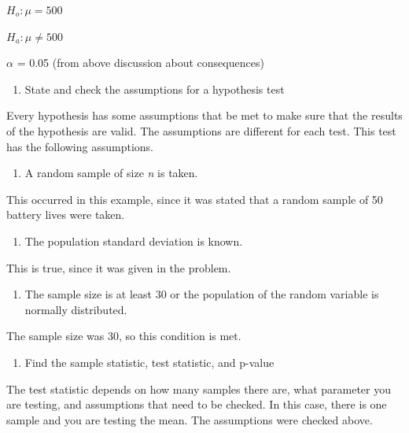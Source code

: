 \documentclass[]{book}
\providecommand{\tightlist}{%
  \setlength{\itemsep}{0pt}\setlength{\parskip}{0pt}}
\begin{document}
\(H_o:\mu=500\)

\(H_a:\mu\ne500\)

\(\alpha\) = 0.05 (from above discussion about consequences)

\begin{enumerate}
\def\labelenumi{\arabic{enumi}.}
\setcounter{enumi}{2}
\tightlist
\item
  State and check the assumptions for a hypothesis test
\end{enumerate}

Every hypothesis has some assumptions that be met to make sure that the results of the hypothesis are valid. The assumptions are different for each test. This test has the following assumptions.

\begin{enumerate}
\def\labelenumi{\alph{enumi}.}
\tightlist
\item
  A random sample of size \emph{n} is taken.
\end{enumerate}

This occurred in this example, since it was stated that a random sample of 50 battery lives were taken.

\begin{enumerate}
\def\labelenumi{\alph{enumi}.}
\setcounter{enumi}{1}
\tightlist
\item
  The population standard deviation is known.
\end{enumerate}

This is true, since it was given in the problem.

\begin{enumerate}
\def\labelenumi{\alph{enumi}.}
\setcounter{enumi}{2}
\tightlist
\item
  The sample size is at least 30 or the population of the random variable is normally distributed.
\end{enumerate}

The sample size was 30, so this condition is met.

\begin{enumerate}
\def\labelenumi{\arabic{enumi}.}
\setcounter{enumi}{3}
\tightlist
\item
  Find the sample statistic, test statistic, and p-value
\end{enumerate}

The test statistic depends on how many samples there are, what parameter you are testing, and assumptions that need to be checked. In this case, there is one sample and you are testing the mean. The assumptions were checked above.
\end{document}
